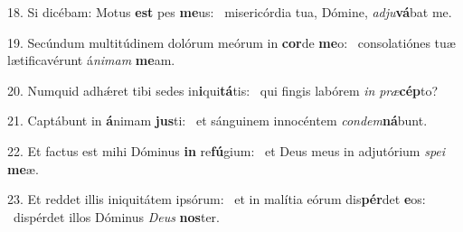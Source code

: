 18. Si dicébam: Motus \textbf{est} pes \textbf{me}us: \ast\  misericórdia tua, Dómine, \textit{ad}\textit{ju}\textbf{vá}bat me.\

19. Secúndum multitúdinem dolórum meórum in \textbf{cor}de \textbf{me}o: \ast\  consolatiónes tuæ lætificavérunt á\textit{ni}\textit{mam} \textbf{me}am.\

20. Numquid adhǽret tibi sedes in\textbf{i}qui\textbf{tá}tis: \ast\  qui fingis labórem \textit{in} \textit{præ}\textbf{cép}to?\

21. Captábunt in \textbf{á}nimam \textbf{jus}ti: \ast\  et sánguinem innocéntem \textit{con}\textit{dem}\textbf{ná}bunt.\

22. Et factus est mihi Dóminus \textbf{in} re\textbf{fú}gium: \ast\  et Deus meus in adjutórium \textit{spe}\textit{i} \textbf{me}æ.\

23. Et reddet illis iniquitátem ipsórum: \dag\  et in malítia eórum dis\textbf{pér}det \textbf{e}os: \ast\  dispérdet illos Dóminus \textit{De}\textit{us} \textbf{nos}ter.\

